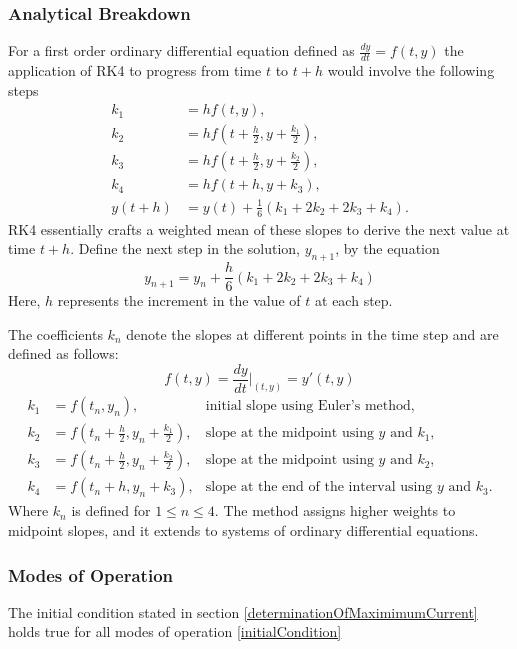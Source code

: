 \subsubsection{Analytical Breakdown}
For a first order ordinary differential equation defined as $\frac{dy}{dt} = f(t, y)$ the application of RK4 to progress from time $t$ to $t + h$ would involve the following steps
\begin{equation}
\begin{aligned}
k_1 &= hf(t, y), \\
k_2 &= hf(t + \frac{h}{2}, y + \frac{k_1}{2}), \\
k_3 &= hf(t + \frac{h}{2}, y + \frac{k_2}{2}), \\
k_4 &= hf(t + h, y + k_3), \\
y(t + h) &= y(t) + \frac{1}{6}(k_1 + 2k_2 + 2k_3 + k_4).
\end{aligned}
\end{equation}
RK4 essentially crafts a weighted mean of these slopes to derive the next value at time $t + h$. Define the next step in the solution, $y_{n+1}$, by the equation
\begin{equation}
y_{n+1} = y_n + \frac{h}{6} (k_1 + 2k_2 + 2k_3 + k_4)
\end{equation}
Here, $h$ represents the increment in the value of $t$ at each step.

The coefficients $k_n$ denote the slopes at different points in the time step and are defined as follows:
\begin{equation}
f(t, y) = \frac{dy}{dt}\bigg|_{(t, y)} = y'(t, y)
\end{equation}
\begin{align*}
k_1 &= f(t_n, y_n), &\text{initial slope using Euler's method},\\
k_2 &= f \left(t_n + \frac{h}{2}, y_n + \frac{k_1}{2}\right), &\text{slope at the midpoint using $y$ and $k_1$},\\
k_3 &= f \left(t_n + \frac{h}{2}, y_n + \frac{k_2}{2}\right), &\text{slope at the midpoint using $y$ and $k_2$},\\
k_4 &= f(t_n + h, y_n + k_3), &\text{slope at the end of the interval using $y$ and $k_3$}.
\end{align*}
Where $k_n$ is defined for $1 \leq n \leq 4$. The method assigns higher weights to midpoint slopes, and it extends to systems of ordinary differential equations. 

\subsubsection{Modes of Operation}
The initial condition stated in section \ref{determinationOfMaximimumCurrent} holds true for all modes of operation \eqref{initialCondition} 

